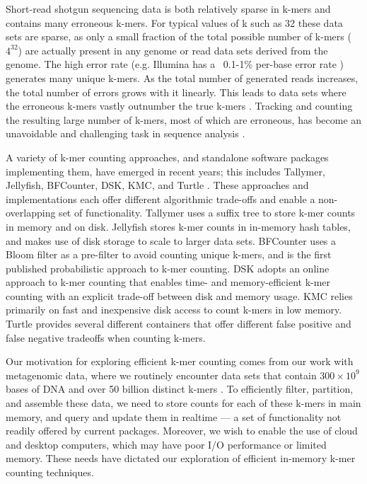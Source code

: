 \documentclass[10pt]{article}
\begin{document}

Short-read shotgun sequencing data is both relatively sparse in
k-mers and contains many erroneous k-mers.  For typical values of k such 
as 32 these data sets are sparse, as only a small fraction of
the total possible number of k-mers ($4^{32}$) are actually present in
any genome or read data sets derived from the genome.  The 
high error rate (e.g. Illumina has a ~0.1-1\%
per-base error rate \cite{pubmed19997069}) generates many unique k-mers. 
As the total number of generated reads increases, the
total number of errors grows with it linearly. This leads to data sets where the
erroneous k-mers vastly outnumber the true k-mers \cite{Conway2011}.
Tracking and counting the resulting large number of k-mers, most of
which are erroneous, has become an unavoidable and challenging task
in sequence analysis
\cite{Minoche2011}.

A variety of k-mer counting approaches, and standalone software
packages implementing them, have emerged in recent years; this
includes Tallymer, Jellyfish, BFCounter, DSK, KMC, and Turtle \cite{Kurtz2008,
Marcais2011, Melsted2011, Rizk2013, Deorowicz2013, Roy2013}.
These
approaches and implementations each offer different algorithmic
trade-offs and enable a non-overlapping set
of functionality.  Tallymer uses a suffix tree to store k-mer counts
in memory and on disk.  Jellyfish stores k-mer counts in in-memory
hash tables, and makes use of disk storage to scale to larger
data sets.  BFCounter uses a Bloom filter as a pre-filter to avoid
counting unique k-mers, and is the first published probabilistic approach
to k-mer counting.  DSK adopts an online approach to k-mer counting that
enables time- and memory-efficient k-mer counting with an explicit
trade-off between disk and memory usage.  KMC relies primarily
on fast and inexpensive disk access to count k-mers in low
memory.  Turtle provides several different containers that offer
different false positive and false negative tradeoffs when counting k-mers.

Our motivation for exploring efficient k-mer counting comes from our
work with metagenomic data, where we routinely encounter data sets
that contain $300 \times 10^9$ bases of DNA and over 50 billion
distinct k-mers \cite{Howe2012}.  To efficiently filter,
partition, and assemble these data, we need to store counts for each
of these k-mers in main memory, and query and update them in realtime
--- a set of functionality not readily offered by current packages.
Moreover, we wish to enable the use of cloud and desktop
computers, which may have poor I/O performance or limited memory. These
needs have
dictated our exploration of efficient in-memory k-mer counting
techniques.
\end{document}
